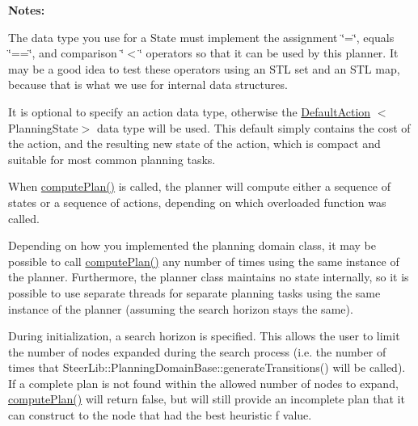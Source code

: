 {\bfseries  Notes\-: }


\begin{DoxyItemize}
\item The data type you use for a State must implement the assignment \char`\"{}=\char`\"{}, equals \char`\"{}==\char`\"{}, and comparison \char`\"{}$<$\char`\"{} operators so that it can be used by this planner. It may be a good idea to test these operators using an S\-T\-L set and an S\-T\-L map, because that is what we use for internal data structures.
\end{DoxyItemize}


\begin{DoxyItemize}
\item It is optional to specify an action data type, otherwise the \hyperlink{class_default_action}{Default\-Action} $<$Planning\-State$>$ data type will be used. This default simply contains the cost of the action, and the resulting new state of the action, which is compact and suitable for most common planning tasks.
\end{DoxyItemize}


\begin{DoxyItemize}
\item When \hyperlink{class_best_first_search_planner_a777fb06939a33b3f3effb24b0dbda076}{compute\-Plan()} is called, the planner will compute either a sequence of states or a sequence of actions, depending on which overloaded function was called.
\end{DoxyItemize}


\begin{DoxyItemize}
\item Depending on how you implemented the planning domain class, it may be possible to call \hyperlink{class_best_first_search_planner_a777fb06939a33b3f3effb24b0dbda076}{compute\-Plan()} any number of times using the same instance of the planner. Furthermore, the planner class maintains no state internally, so it is possible to use separate threads for separate planning tasks using the same instance of the planner (assuming the search horizon stays the same).
\end{DoxyItemize}


\begin{DoxyItemize}
\item During initialization, a search horizon is specified. This allows the user to limit the number of nodes expanded during the search process (i.\-e. the number of times that Steer\-Lib\-::\-Planning\-Domain\-Base\-::generate\-Transitions() will be called). If a complete plan is not found within the allowed number of nodes to expand, \hyperlink{class_best_first_search_planner_a777fb06939a33b3f3effb24b0dbda076}{compute\-Plan()} will return false, but will still provide an incomplete plan that it can construct to the node that had the best heuristic f value.
\end{DoxyItemize}

